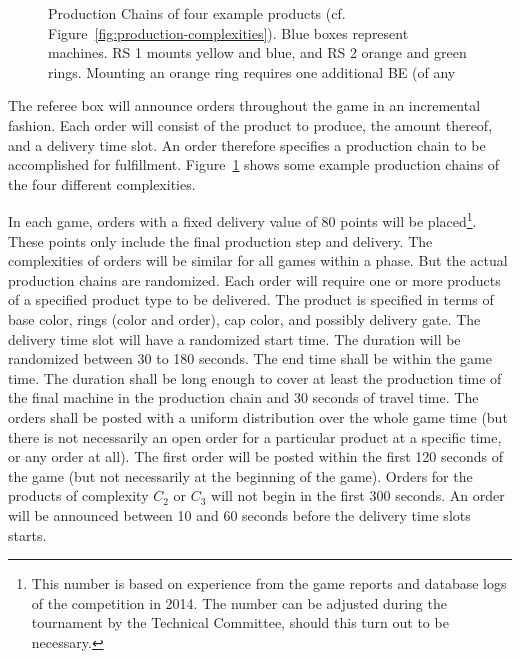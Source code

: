 \documentclass[12pt,twoside]{article}
\newcommand{\reffig}[1]{Figure~\ref{#1}}
\begin{document}
\begin{figure}
{}{%
  \caption{Production Chains of four example products
    (cf. \reffig{fig:production-complexities}). Blue boxes represent
    machines. RS 1 mounts yellow and blue, and RS 2 orange and green
    rings. Mounting an orange ring requires one additional BE (of any
    }
  \label{fig:production-chains}  
}
\vspace{-1mm}
\end{figure}
The referee box will announce orders throughout the game in an
incremental fashion. Each order will consist of the product to
produce, the amount thereof, and a delivery time slot. An order
therefore specifies a production chain to be accomplished for
fulfillment. \reffig{fig:production-chains} shows some example
production chains of the four different complexities.

In each game, orders with a fixed delivery value of 80 points will be
placed\footnote{This number is based on experience from the game
  reports and database logs of the competition in 2014. The number can
  be adjusted during the tournament by the Technical Committee, should
  this turn out to be necessary.}. These points only include the final
production step and delivery. The complexities of orders will be
similar for all games within a phase. But the actual production chains
are randomized. Each order will require one or more products of a
specified product type to be delivered. The product is specified in
terms of base color, rings (color and order), cap color, and possibly
delivery gate. The delivery time slot will have a randomized start
time. The duration will be randomized between 30 to 180 seconds. The
end time shall be within the game time. The duration shall be long
enough to cover at least the production time of the final machine in
the production chain and 30 seconds of travel time. The orders shall
be posted with a uniform distribution over the whole game time (but
there is not necessarily an open order for a particular product at a
specific time, or any order at all). The first order will be posted
within the first 120 seconds of the game (but not necessarily at the
beginning of the game). Orders for the products of complexity $C_2$ or
$C_3$ will not begin in the first 300 seconds. An order will be
announced between 10 and 60 seconds before the delivery time slots
starts.
\end{document}
